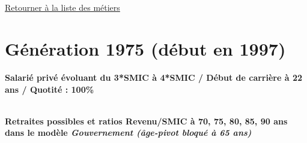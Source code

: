 ~\\ 
 


   
 \localtableofcontents 

~\\ 
 
 \hyperlink{page.2}{\noindent Retourner à la liste des métiers}

 \newpage 

\section{Génération 1975 (début en 1997)\label{Ascendant34_100_22_1975_0}} 
 
{\bf \noindent Salarié privé évoluant du 3*SMIC à 4*SMIC / Début de carrière à 22 ans / Quotité : 100\%}  ~ 

 ~\\{\bf \noindent Retraites possibles et ratios Revenu/SMIC à 70, 75, 80, 85, 90 ans dans le modèle \emph{Gouvernement (âge-pivot bloqué à 65 ans)}}  
 

